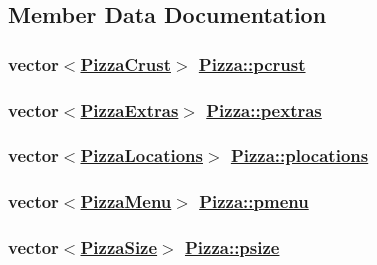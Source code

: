 \subsection{Member Data Documentation}
\hypertarget{class_pizza_996e08e9df9ac8ddc88bd05cd6e02761}{
\subsubsection[pcrust]{\setlength{\rightskip}{0pt plus 5cm}vector$<$\hyperlink{class_pizza_crust}{Pizza\-Crust}$>$ \hyperlink{class_pizza_996e08e9df9ac8ddc88bd05cd6e02761}{Pizza::pcrust}}}
\label{class_pizza_996e08e9df9ac8ddc88bd05cd6e02761}


\hypertarget{class_pizza_daa120a92c418c69c30c510e3d6fceb4}{
\subsubsection[pextras]{\setlength{\rightskip}{0pt plus 5cm}vector$<$\hyperlink{class_pizza_extras}{Pizza\-Extras}$>$ \hyperlink{class_pizza_daa120a92c418c69c30c510e3d6fceb4}{Pizza::pextras}}}
\label{class_pizza_daa120a92c418c69c30c510e3d6fceb4}


\hypertarget{class_pizza_4089a0661af312f0d870f8ac9a4bd03c}{
\subsubsection[plocations]{\setlength{\rightskip}{0pt plus 5cm}vector$<$\hyperlink{class_pizza_locations}{Pizza\-Locations}$>$ \hyperlink{class_pizza_4089a0661af312f0d870f8ac9a4bd03c}{Pizza::plocations}}}
\label{class_pizza_4089a0661af312f0d870f8ac9a4bd03c}


\hypertarget{class_pizza_b86f8b99db37aed0b14a52090e90df73}{
\subsubsection[pmenu]{\setlength{\rightskip}{0pt plus 5cm}vector$<$\hyperlink{class_pizza_menu}{Pizza\-Menu}$>$ \hyperlink{class_pizza_b86f8b99db37aed0b14a52090e90df73}{Pizza::pmenu}}}
\label{class_pizza_b86f8b99db37aed0b14a52090e90df73}


\hypertarget{class_pizza_e0615fa3029d85be3e626ed0d6e2f6ae}{
\subsubsection[psize]{\setlength{\rightskip}{0pt plus 5cm}vector$<$\hyperlink{class_pizza_size}{Pizza\-Size}$>$ \hyperlink{class_pizza_e0615fa3029d85be3e626ed0d6e2f6ae}{Pizza::psize}}}
\label{class_pizza_e0615fa3029d85be3e626ed0d6e2f6ae}



